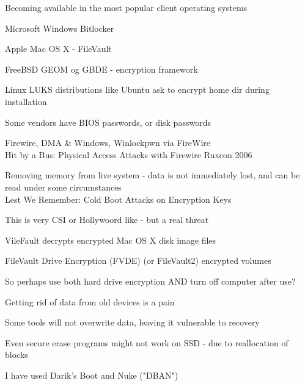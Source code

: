 \documentclass[Screen16to9,17pt]{foils}
\begin{document}


\begin{list1}
\item Becoming available in the most popular client operating systems
\begin{list2}
\item Microsoft Windows Bitlocker
\item Apple Mac OS X - FileVault
\item FreeBSD GEOM og GBDE - encryption framework
\item Linux LUKS distributions like Ubuntu ask to encrypt home dir during installation
\item Some vendors have BIOS passwords, or disk passwords
\end{list2}
\end{list1}



\begin{list1}
\item Firewire, DMA \& Windows, Winlockpwn via FireWire\\
Hit by a Bus: Physical Access Attacks with Firewire Ruxcon 2006
\vskip 5mm
\item Removing memory from live system - data is not immediately lost, and can be read under some circumstances\\
Lest We Remember: Cold Boot Attacks on Encryption Keys\\
\item This is very CSI or Hollywoord like - but a real threat
\item VileFault decrypts encrypted Mac OS X disk image files\\ 

\item  FileVault Drive Encryption (FVDE) (or FileVault2) encrypted volumes\\
\end{list1}

\centerline{So perhaps use both hard drive encryption AND turn off computer after use?}



\begin{list1}
\item Getting rid of data from old devices is a pain
\item Some tools will not overwrite data, leaving it vulnerable to recovery
\item Even secure erase programs might not work on SSD - due to reallocation of blocks
\item I have used Darik's Boot and Nuke ("DBAN") 
\end{list1}
\end{document}

